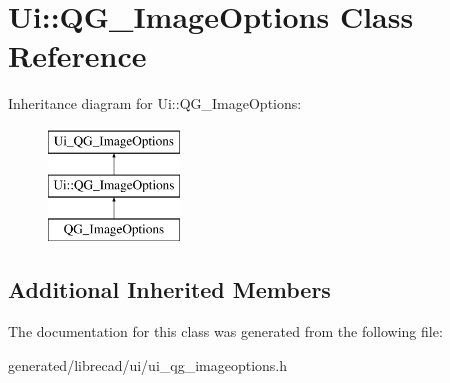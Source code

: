 \hypertarget{classUi_1_1QG__ImageOptions}{\section{Ui\-:\-:Q\-G\-\_\-\-Image\-Options Class Reference}
\label{classUi_1_1QG__ImageOptions}
}
Inheritance diagram for Ui\-:\-:Q\-G\-\_\-\-Image\-Options\-:\begin{figure}[H]
\begin{center}
\leavevmode
\includegraphics[height=3.000000cm]{classUi_1_1QG__ImageOptions}
\end{center}
\end{figure}
\subsection*{Additional Inherited Members}


The documentation for this class was generated from the following file\-:\begin{DoxyCompactItemize}
\item 
generated/librecad/ui/ui\-\_\-qg\-\_\-imageoptions.\-h\end{DoxyCompactItemize}

